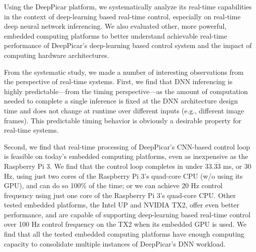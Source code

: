 Using the DeepPicar platform, we systematically analyze its real-time
capabilities in the context of deep-learning based real-time
control, especially on real-time deep neural network inferencing.
We also evaluated other, more powerful, embedded computing
platforms to better understand achievable real-time performance of
DeepPicar's deep-learning based control system and the impact of
computing hardware architectures.

%
%
%
%
%
%
From the systematic study, we made a number of interesting
observations from the perspective of real-time systems.
First, we find that DNN inferencing is highly predictable---from the
timing perspective---as the amount of computation needed to complete a
single inference is fixed at the DNN architecture design time and does
not change at runtime over different inputs (e.g., different image
frames). This predictable timing behavior is obviously a desirable
property for real-time systems.

Second, we find that real-time processing of DeepPicar's CNN-based
control loop is feasible on today's embedded computing platforms, even 
as inexpensive as the Raspberry Pi 3. We find that the control loop 
completes in under 33.$\overline{\mbox{33}}$ ms, or 30 Hz, using just two 
cores of the Raspberry Pi 3's quad-core CPU (w/o using its GPU), and can
do so 100\% of the time; or we can achieve 20 Hz control frequency using
just one core of the Raspberry Pi 3's quad-core CPU.
Other tested embedded platforms, the Intel UP and NVIDIA TX2, offer even
better performance, and are capable of supporting deep-learning based 
real-time control over 100 Hz control frequency on the TX2 when its
embedded GPU is used.
We find that all the tested embedded computing platforms have 
enough computing capacity to consolidate multiple instances of
DeepPicar's DNN workload.

